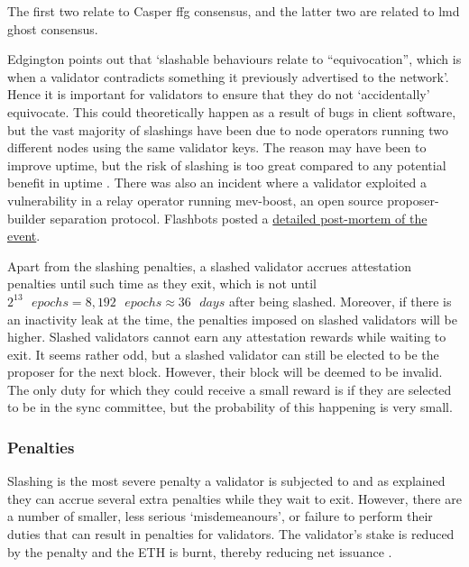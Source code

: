 \documentclass[UTF8]{article}
\begin{document}
The first two relate to Casper \gls{ffg} consensus, and the latter two are related to \gls{lmd} \gls{ghost} consensus.

Edgington points out that `slashable behaviours relate to ``equivocation'', which is when a validator contradicts something it previously advertised to the network'. Hence it is important for validators to ensure that they do not `accidentally' equivocate. This could theoretically happen as a result of bugs in client software, but the vast majority of slashings have been due to node operators running two different nodes using the same validator keys. The reason may have been to improve uptime, but the risk of slashing is too great compared to any potential benefit in uptime \cite{Edgington2023}. There was also an incident where a validator exploited a vulnerability in a relay operator running mev-boost, an open source proposer-builder separation protocol. Flashbots posted a \href{https://collective.flashbots.net/t/post-mortem-april-3rd-2023-mev-boost-relay-incident-and-related-timing-issue/1540}{detailed post-mortem of the event}.

Apart from the slashing penalties, a slashed validator accrues attestation penalties until such time as they exit, which is not until $2^{13} \texttt{ }epochs = 8,192 \texttt{ }epochs \approx 36 \texttt{ } days$ after being slashed. Moreover,  if there is an inactivity leak at the time, the penalties imposed on slashed validators will be higher. Slashed validators cannot earn any attestation rewards while waiting to exit. It seems rather odd, but a slashed validator can still be elected to be the proposer for the next block. However, their block will be deemed to be invalid. The only duty for which they could receive a small reward is if they are selected to be in the sync committee, but the probability of this happening is very small. 

\subsubsection*{Penalties}
Slashing is the most severe penalty a validator is subjected to and as explained they can accrue several extra penalties while they wait to exit. However, there are a number of smaller, less serious `misdemeanours', or failure to perform their duties that can result in penalties for validators. The validator's stake is reduced by the penalty and the ETH is burnt, thereby reducing net issuance \cite{Edgington2023}. \\
\end{document}
